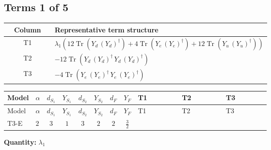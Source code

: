 \documentclass[8pt]{article}
\begin{document}
\begin{landscape}
\subsection*{Terms 1 of 5}
\begin{center}
\begin{tabular}{@{}c >{\raggedright\arraybackslash}p{0.82\linewidth}@{}}
\toprule
Column & Representative term structure \\
\midrule
T1 & \(\displaystyle {\lambda_1} (12 \operatorname{Tr}\!\left({Y_d}\,\left({Y_d}\right)^{\dagger}\right)+4 \operatorname{Tr}\!\left({Y_e}\,\left({Y_e}\right)^{\dagger}\right)+12 \operatorname{Tr}\!\left({Y_u}\,\left({Y_u}\right)^{\dagger}\right))\) \\
\midrule
T2 & \(\displaystyle -12 \operatorname{Tr}\!\left({Y_d}\,\left({Y_d}\right)^{\dagger}\,{Y_d}\,\left({Y_d}\right)^{\dagger}\right)\) \\
\midrule
T3 & \(\displaystyle -4 \operatorname{Tr}\!\left({Y_e}\,\left({Y_e}\right)^{\dagger}\,{Y_e}\,\left({Y_e}\right)^{\dagger}\right)\) \\
\midrule
\bottomrule
\end{tabular}
\end{center}
\smallskip
\tiny
\begin{longtable}{@{}llcccccc >{\raggedright\arraybackslash}p{0.21\linewidth} >{\raggedright\arraybackslash}p{0.21\linewidth} >{\raggedright\arraybackslash}p{0.21\linewidth}@{}}
\toprule
Model & $\alpha$ & $d_{S_1}$ & $Y_{S_1}$ & $d_{S_2}$ & $Y_{S_2}$ & $d_F$ & $Y_F$ & T1 & T2 & T3 \\
\midrule
\endfirsthead
\toprule
Model & $\alpha$ & $d_{S_1}$ & $Y_{S_1}$ & $d_{S_2}$ & $Y_{S_2}$ & $d_F$ & $Y_F$ & T1 & T2 & T3 \\
\midrule
\endhead
T3-E & $2$ & $3$ & $1$ & $3$ & $2$ & $2$ & $\frac{3}{2}$ & \scriptsize\adjustbox{max width=\linewidth}{$\begin{gathered} {\lambda_1} (12 \operatorname{Tr}\!\left({Y_d}\,\left({Y_d}\right)^{\dagger}\right)+4 \operatorname{Tr}\!\left({Y_e}\,\left({Y_e}\right)^{\dagger}\right)+12 \operatorname{Tr}\!\left({Y_u}\,\left({Y_u}\right)^{\dagger}\right))\end{gathered}$} & \scriptsize\adjustbox{max width=\linewidth}{$\begin{gathered} -12 \operatorname{Tr}\!\left({Y_d}\,\left({Y_d}\right)^{\dagger}\,{Y_d}\,\left({Y_d}\right)^{\dagger}\right)\end{gathered}$} & \scriptsize\adjustbox{max width=\linewidth}{$\begin{gathered} -4 \operatorname{Tr}\!\left({Y_e}\,\left({Y_e}\right)^{\dagger}\,{Y_e}\,\left({Y_e}\right)^{\dagger}\right)\end{gathered}$} \\
\midrule
\bottomrule
\end{longtable}
\clearpage
\noindent\textbf{Quantity: }$\lambda_1$\par\smallskip

\end{landscape}
\end{document}
